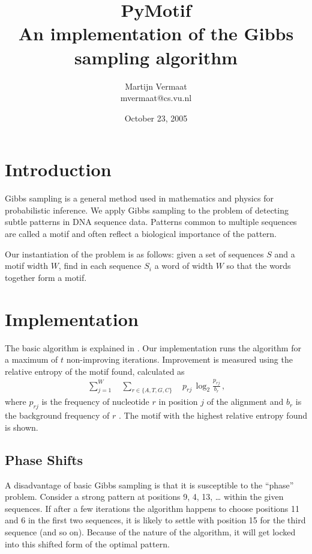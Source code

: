 \documentclass[a4paper,11pt]{article}
\title{PyMotif\\
\normalsize{An implementation of the Gibbs sampling algorithm}}
\author{
    Martijn Vermaat\\
    mvermaat@cs.vu.nl
}
\date{October 23, 2005}
\begin{document}
\maketitle


\section{Introduction}

Gibbs sampling is a general method used in mathematics and physics for
probabilistic inference. We apply Gibbs sampling to the problem of detecting
subtle patterns in DNA sequence data. Patterns common to multiple sequences
are called a motif and often reflect a biological importance of the pattern.

Our instantiation of the problem is as follows: given a set of sequences $S$
and a motif width $W$, find in each sequence $S_{i}$ a word of width $W$ so
that the words together form a motif.


\section{Implementation}

The basic algorithm is explained in \cite{Lawrence93}. Our implementation runs
the algorithm for a maximum of $t$ non-improving iterations. Improvement is
measured using the relative entropy of the motif found, calculated as
\begin{align*}
\sum_{j=1}^{W} \quad \sum_{r \in \{A,T,G,C\}} \quad p_{r j} \, \log_{2}
\frac{p_{r j}}{b_{r}} \, \text{,}
\end{align*}
where $p_{r j}$ is the frequency of nucleotide $r$ in position $j$ of the
alignment and $b_{r}$ is the background frequency of $r$ \cite{Jones04}. The
motif with the highest relative entropy found is shown.


\subsection*{Phase Shifts}

A disadvantage of basic Gibbs sampling is that it is susceptible to the
``phase'' problem. Consider a strong pattern at positions 9, 4, 13, \ldots
within the given sequences. If after a few iterations the algorithm happens to
choose positions 11 and 6 in the first two sequences, it is likely to settle
with position 15 for the third sequence (and so on). Because of the nature of
the algorithm, it will get locked into this shifted form of the optimal
pattern.
\end{document}
